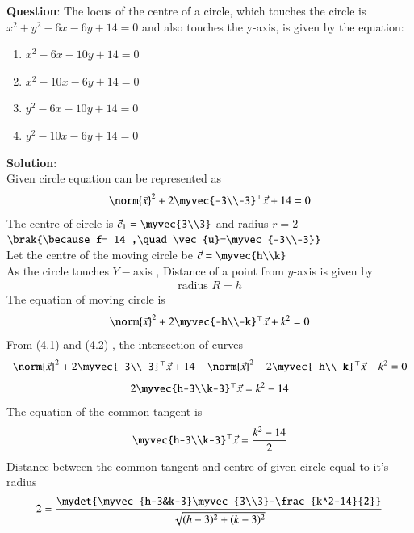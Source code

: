 \documentclass[journal]{IEEEtran}
\begin{document}
\textbf{Question}:
The locus of the centre of a circle, which touches the circle is $x^2 + y^2 -6x -6y +14 =0$ and also touches the y-axis, is given by the equation:
\begin{enumerate}
    \item $x^2-6x-10y+14=0$
    \item $x^2-10x-6y+14=0$
    \item $y^2-6x-10y+14=0$
    \item $y^2-10x-6y+14=0$
\end{enumerate}
\textbf{Solution}:\\
Given circle equation can be represented as
\begin{align}
    \norm{\vec{x}}^2+2\myvec{-3\\-3}^\top\vec{x}+14=0
\end{align}
The centre of circle is $\vec{c}_1=\myvec{3\\3}$ and radius $r=2$ $\brak{\because f= 14 ,\quad \vec{u}=\myvec{-3\\-3}} $\\
Let the centre of the moving circle be $\vec{c}=\myvec{h\\k}$\\
As the circle touches $Y-$axis , Distance of a point from $y$-axis is given by
\begin{align*}
  \text{radius }  R=h
\end{align*}
The equation of moving circle is 
\begin{align}
    \norm{\vec{x}}^2+2\myvec{-h\\-k}^\top\vec{x}+k^2=0
\end{align}
From (4.1) and (4.2) , the intersection of curves
\begin{align}
    \norm{\vec{x}}^2+2\myvec{-3\\-3}^\top\vec{x}+14 -  \norm{\vec{x}}^2-2\myvec{-h\\-k}^\top\vec{x}-k^2 =0 
    \end{align}
    \begin{align}
    2\myvec{h-3\\k-3}^\top\vec{x}= k^2-14
\end{align}
The equation of the common tangent is 
\begin{align}
\myvec{h-3\\k-3}^\top\vec{x}= \frac{k^2-14}{2}
\end{align}
Distance between the common tangent and centre of given circle equal to it's radius
\begin{align}
 2=\frac{\mydet{\myvec{h-3&k-3}\myvec{3\\3}-\frac{k^2-14}{2}}}{\sqrt{(h-3)^2 + (k-3)^2}}
\end{align}
\end{document}
